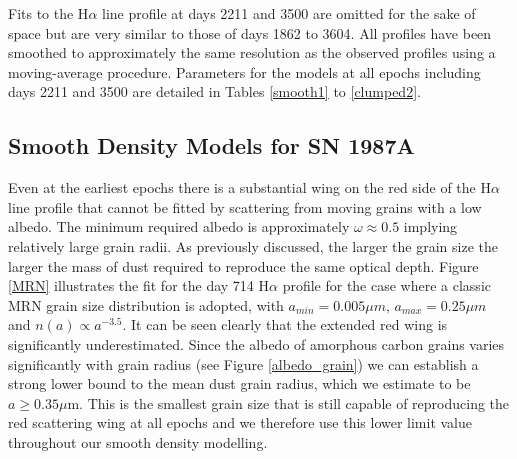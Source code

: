 \documentclass[useAMS,usenatbib,usegraphicx]{mnras}
\begin{document}
Fits to the H$\alpha$ line profile at days 2211 and 3500 are omitted for the sake of space but are very similar to those of days 1862 to 3604.  All profiles have been smoothed to approximately the same resolution as the observed profiles using a moving-average procedure.  Parameters for the models at all epochs including days 2211 and 3500 are detailed in Tables \ref{smooth1} to \ref{clumped2}.


\subsection{Smooth Density Models for SN 1987A}
\label{smooth_models}

Even at the earliest epochs there is a substantial wing on the red side of 
the H$\alpha$ line profile that cannot be fitted by scattering from moving grains with a low albedo.  The 
minimum required albedo is approximately $\omega \approx 0.5$ implying relatively large grain radii.  As previously discussed, the larger 
the grain size the larger the mass of dust required to reproduce the same 
optical depth.  Figure \ref{MRN} illustrates the 
 fit for the day 714 H$\alpha$ profile for the case where a classic MRN \citep{Mathis1977} grain size 
distribution is adopted, with $a_{min}=0.005 \mu m$, $a_{max}=0.25 \mu m$ 
and $n(a) \propto a^{-3.5}$.  It can be seen clearly that the extended red wing is 
significantly underestimated.  Since the albedo of  
amorphous carbon grains varies significantly with grain radius (see Figure \ref{albedo_grain}) we can establish a strong 
lower bound to the mean dust grain radius, which we estimate to be $a \ge 0.35\mu$m.  This is the smallest grain size that is still 
capable of reproducing the red scattering wing at all epochs and we 
therefore use this lower limit value throughout our smooth density modelling.
\end{document}

